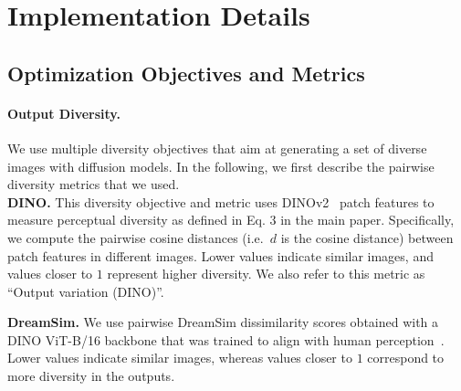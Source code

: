 \documentclass[10pt,twocolumn,letterpaper]{article}
\begin{document}
{
    \small
    
    
}



\clearpage

\setcounter{section}{0}
\setcounter{figure}{0}
\setcounter{table}{0}
\setcounter{equation}{0}


\section{Implementation Details}


\subsection{Optimization Objectives and Metrics}
\paragraph{Output Diversity.}
We use multiple diversity objectives that aim at generating a set of diverse images with diffusion models. In the following, we first describe the pairwise diversity metrics that we used. \\

\noindent \textbf{DINO.} This diversity objective and metric uses DINOv2~\cite{dinov2} patch features to measure perceptual diversity as defined in Eq. 3 in the main paper. Specifically, we compute the pairwise cosine distances (i.e.\ $d$ is the cosine distance) between patch features in different images. Lower values indicate similar images, and values closer to $1$ represent higher diversity. We also refer to this metric as ``Output variation (DINO)''.


\noindent \textbf{DreamSim.} We use pairwise DreamSim dissimilarity scores obtained with a DINO ViT-B/16 backbone that was trained to align with human perception~\cite{fu2023dreamsim}. Lower values indicate similar images, whereas values closer to $1$ correspond to more diversity in the outputs.
\end{document}
